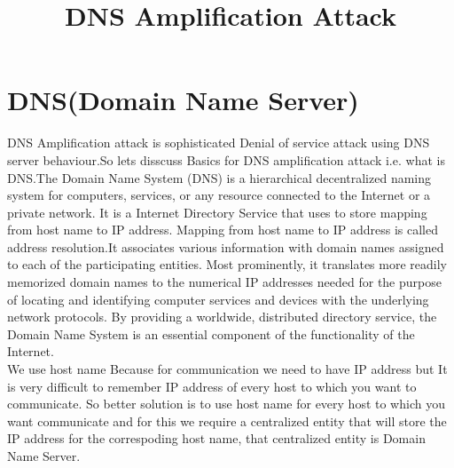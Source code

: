 \documentclass[11pt]{article}
\date{\vspace{-5ex}}
\title{\bf{DNS Amplification Attack}}
\date{}
\begin{document}
\maketitle

\newpage
\section{DNS(Domain Name Server)}
DNS Amplification attack is sophisticated Denial of service attack using DNS server behaviour.So lets disscuss Basics for DNS amplification attack i.e. what is DNS.The Domain Name System (DNS) is a hierarchical decentralized naming system for computers, services, or any resource connected to the Internet or a private network.  It is a Internet Directory Service that uses to store mapping from host name to IP address. Mapping from host name to IP address is called address resolution.It associates various information with domain names assigned to each of the participating entities. Most prominently, it translates more readily memorized domain names to the numerical IP addresses needed for the purpose of locating and identifying computer services and devices with the underlying network protocols. By providing a worldwide, distributed directory service, the Domain Name System is an essential component of the functionality of the Internet.
\\
We use host name Because for communication we need to have IP address but It is very difficult to remember IP address of every host to which you want to communicate. So better solution is to use host name for every host to which you want communicate and for this we require a centralized entity that will store the IP address for the correspoding host name, that centralized entity is Domain Name Server.
\end{document}

